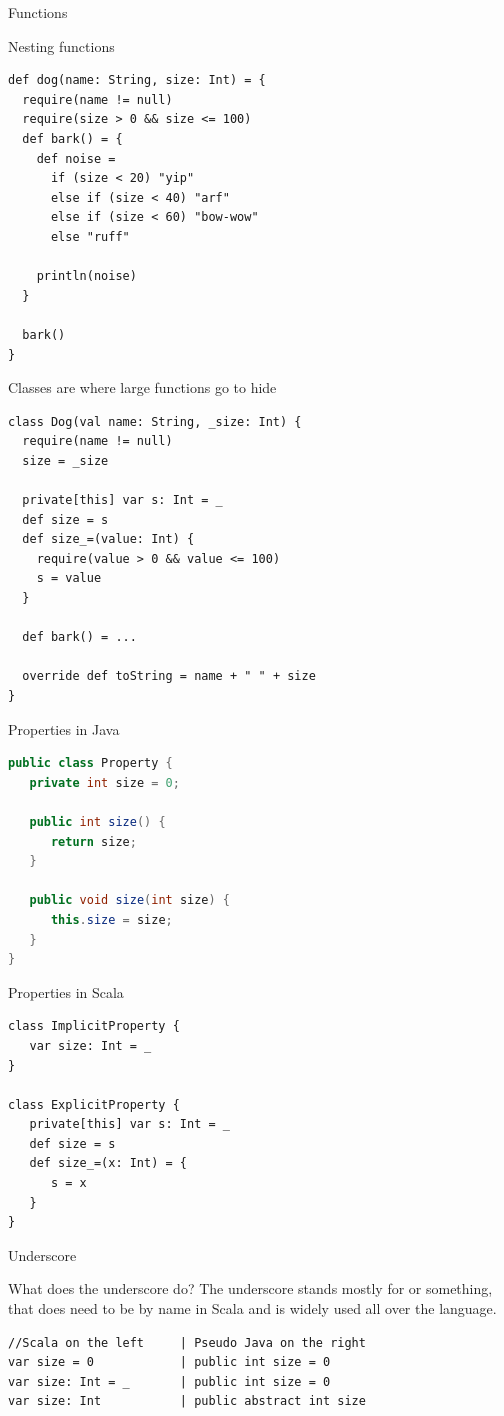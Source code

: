 \begin{frame}[fragile]{Functions}
\begin{exampleblock}{Nesting functions}
\begin{lstlisting}
def dog(name: String, size: Int) = {
  require(name != null)
  require(size > 0 && size <= 100)
  def bark() = {
    def noise =
      if (size < 20) "yip"
      else if (size < 40) "arf"
      else if (size < 60) "bow-wow"
      else "ruff"
        
    println(noise)
  }
  
  bark()
}
\end{lstlisting}
\end{exampleblock}
\end{frame}

\begin{frame}[fragile]{Classes are where large functions go to hide}
\begin{lstlisting}
class Dog(val name: String, _size: Int) {
  require(name != null)
  size = _size

  private[this] var s: Int = _
  def size = s
  def size_=(value: Int) {
    require(value > 0 && value <= 100)
    s = value
  }

  def bark() = ...
  
  override def toString = name + " " + size
}
\end{lstlisting}
\end{frame}

\begin{frame}[fragile]{Properties in Java}
\begin{lstlisting}[language=java]
public class Property {
   private int size = 0;

   public int size() {
      return size;
   }

   public void size(int size) {
      this.size = size;
   }
}
\end{lstlisting}
\end{frame}

\begin{frame}[fragile]{Properties in Scala}
\begin{lstlisting}
class ImplicitProperty {
   var size: Int = _
}

class ExplicitProperty {
   private[this] var s: Int = _
   def size = s	
   def size_=(x: Int) = {
      s = x
   }
}
\end{lstlisting}
\end{frame}

\begin{frame}[fragile]{Underscore}
\begin{block}{What does the underscore do?}
The underscore stands mostly for  or something,
that does  need to be  by name in Scala
and is widely used all over the language.
\end{block}
\begin{lstlisting}
//Scala on the left     | Pseudo Java on the right
var size = 0            | public int size = 0
var size: Int = _       | public int size = 0
var size: Int           | public abstract int size
\end{lstlisting}
\end{frame}

